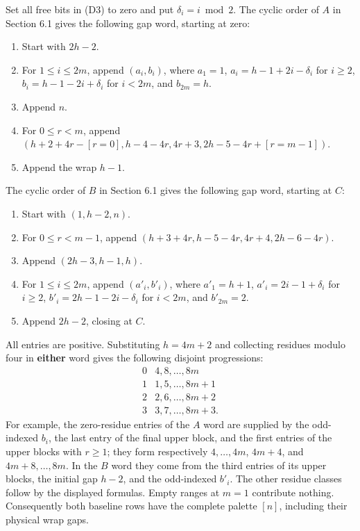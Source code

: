 \documentclass[11pt,a4paper]{article}
\providecommand{\tightlist}{\setlength{\itemsep}{0pt}\setlength{\parskip}{0pt}}
\begin{document}
Set all free bits in (D3) to zero and put \(\delta_i=i\bmod2\). The cyclic order of \(A\) in Section 6.1 gives the following gap word, starting at zero:

\begin{enumerate}
\def\labelenumi{\arabic{enumi}.}
\tightlist
\item
  Start with \(2h-2\).
\item
  For \(1\leq i\leq2m\), append \((a_i,b_i)\), where \(a_1=1\), \(a_i=h-1+2i-\delta_i\) for \(i\geq2\), \(b_i=h-1-2i+\delta_i\) for \(i<2m\), and \(b_{2m}=h\).
\item
  Append \(n\).
\item
  For \(0\leq r<m\), append \((h+2+4r-[r=0],h-4-4r,4r+3,2h-5-4r+[r=m-1])\).
\item
  Append the wrap \(h-1\).
\end{enumerate}

The cyclic order of \(B\) in Section 6.1 gives the following gap word, starting at \(C\):

\begin{enumerate}
\def\labelenumi{\arabic{enumi}.}
\tightlist
\item
  Start with \((1,h-2,n)\).
\item
  For \(0\leq r<m-1\), append \((h+3+4r,h-5-4r,4r+4,2h-6-4r)\).
\item
  Append \((2h-3,h-1,h)\).
\item
  For \(1\leq i\leq2m\), append \((a'_i,b'_i)\), where \(a'_1=h+1\), \(a'_i=2i-1+\delta_i\) for \(i\geq2\), \(b'_i=2h-1-2i-\delta_i\) for \(i<2m\), and \(b'_{2m}=2\).
\item
  Append \(2h-2\), closing at \(C\).
\end{enumerate}

All entries are positive. Substituting \(h=4m+2\) and collecting residues modulo four in \textbf{either} word gives the following disjoint progressions: \[
\begin{array}{c|l}
 0&4,8,\ldots,8m\\
 1&1,5,\ldots,8m+1\\
 2&2,6,\ldots,8m+2\\
 3&3,7,\ldots,8m+3.
\end{array}
\] For example, the zero-residue entries of the \(A\) word are supplied by the odd-indexed \(b_i\), the last entry of the final upper block, and the first entries of the upper blocks with \(r\geq1\); they form respectively \(4,\ldots,4m\), \(4m+4\), and \(4m+8,\ldots,8m\). In the \(B\) word they come from the third entries of its upper blocks, the initial gap \(h-2\), and the odd-indexed \(b'_i\). The other residue classes follow by the displayed formulas. Empty ranges at \(m=1\) contribute nothing. Consequently both baseline rows have the complete palette \([n]\), including their physical wrap gaps.
\end{document}

